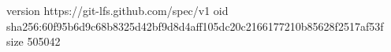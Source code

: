 version https://git-lfs.github.com/spec/v1
oid sha256:60f95b6d9c68b8325d42bf9d8d4aff105dc20c2166177210b85628f2517af53f
size 505042
